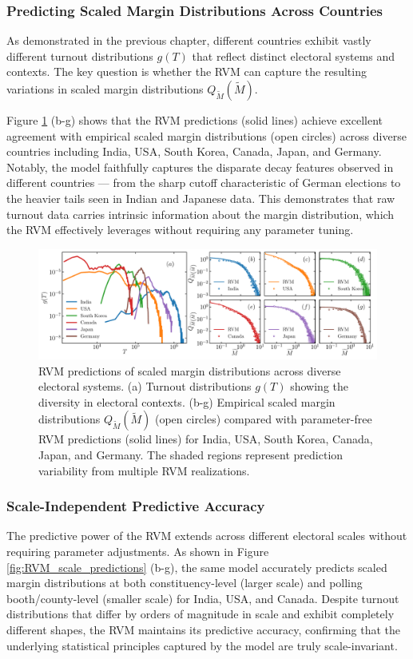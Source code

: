 \subsubsection{Predicting Scaled Margin Distributions Across Countries}
As demonstrated in the previous chapter, different countries exhibit vastly different turnout distributions $g(T)$ that reflect distinct electoral systems and contexts. The key question is whether the RVM can capture the resulting variations in scaled margin distributions $Q_{\widetilde{M}}(\widetilde{M})$.

Figure \ref{fig:RVM_country_predictions} (b-g) shows that the RVM predictions (solid lines) achieve excellent agreement with empirical scaled margin distributions (open circles) across diverse countries including India, USA, South Korea, Canada, Japan, and Germany. Notably, the model faithfully captures the disparate decay features observed in different countries — from the sharp cutoff characteristic of German elections to the heavier tails seen in Indian and Japanese data. This demonstrates that raw turnout data carries intrinsic information about the margin distribution, which the RVM effectively leverages without requiring any parameter tuning.

\begin{figure}[H]
    \centering
    \includegraphics[width=\textwidth]{chapters/chapter5/turnout_margin_empirical_simulation_distribution_pc.pdf}
    \caption{RVM predictions of scaled margin distributions across diverse electoral systems. (a) Turnout distributions $g(T)$ showing the diversity in electoral contexts. (b-g) Empirical scaled margin distributions $Q_{\widetilde{M}}(\widetilde{M})$ (open circles) compared with parameter-free RVM predictions (solid lines) for India, USA, South Korea, Canada, Japan, and Germany. The shaded regions represent prediction variability from multiple RVM realizations.}
    \label{fig:RVM_country_predictions}
\end{figure}

\subsubsection{Scale-Independent Predictive Accuracy}
The predictive power of the RVM extends across different electoral scales without requiring parameter adjustments. As shown in Figure \ref{fig:RVM_scale_predictions} (b-g), the same model accurately predicts scaled margin distributions at both constituency-level (larger scale) and polling booth/county-level (smaller scale) for India, USA, and Canada. Despite turnout distributions that differ by orders of magnitude in scale and exhibit completely different shapes, the RVM maintains its predictive accuracy, confirming that the underlying statistical principles captured by the model are truly scale-invariant.

